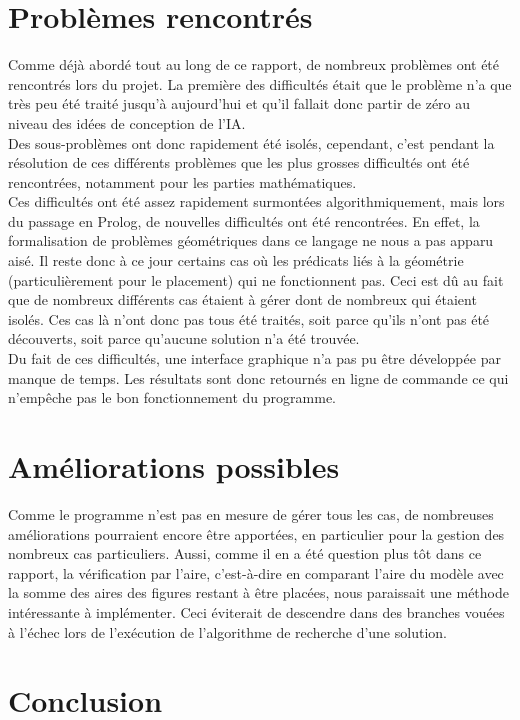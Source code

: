 \documentclass[a4paper, 11pt]{report}
\begin{document}
	\chapter{Problèmes rencontrés}
	
	Comme déjà abordé tout au long de ce rapport, de nombreux problèmes ont été rencontrés lors du projet. La première des difficultés était que le problème n'a que très peu été traité jusqu'à aujourd'hui et qu'il fallait donc partir de zéro au niveau des idées de conception de l'IA.\\
	Des sous-problèmes ont donc rapidement été isolés, cependant, c'est pendant la résolution de ces différents problèmes que les plus grosses difficultés ont été rencontrées, notamment pour les parties mathématiques.\\
	Ces difficultés ont été assez rapidement surmontées algorithmiquement, mais lors du passage en Prolog, de nouvelles difficultés ont été rencontrées. En effet, la formalisation de problèmes géométriques dans ce langage ne nous a pas apparu aisé. Il reste donc à ce jour certains cas où les prédicats liés à la géométrie (particulièrement pour le placement) qui ne fonctionnent pas. Ceci est dû au fait que de nombreux différents cas étaient à gérer dont de nombreux qui étaient isolés. Ces cas là n'ont donc pas tous été traités, soit parce qu'ils n'ont pas été découverts, soit parce qu'aucune solution n'a été trouvée.\\
	Du fait de ces difficultés, une interface graphique n'a pas pu être développée par manque de temps. Les résultats sont donc retournés en ligne de commande ce qui n'empêche pas le bon fonctionnement du programme.
	
	\chapter{Améliorations possibles}
	
	Comme le programme n'est pas en mesure de gérer tous les cas, de nombreuses améliorations pourraient encore \^etre apportées, en particulier pour la gestion des nombreux cas particuliers. Aussi, comme il en a été question plus t\^ot dans ce rapport, la vérification par l'aire, c'est-à-dire en comparant l'aire du modèle avec la somme des aires des figures restant à \^etre placées, nous paraissait une méthode intéressante à implémenter. Ceci éviterait de descendre dans des branches vouées à l’échec lors de l'exécution de l'algorithme de recherche d'une solution.
	
	\chapter*{Conclusion}
	
\end{document}

